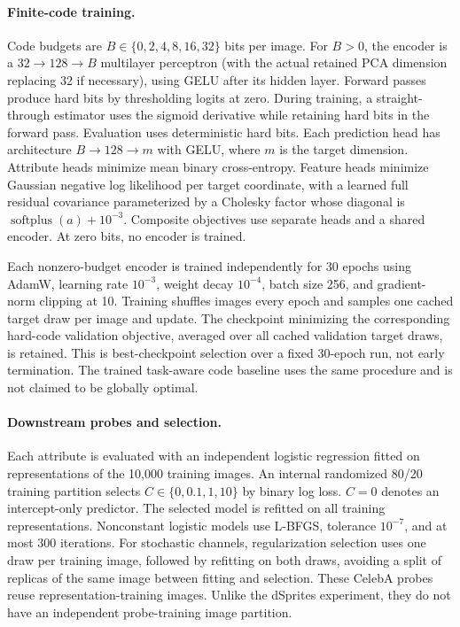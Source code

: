 \paragraph{Finite-code training.}
Code budgets are $B\in\{0,2,4,8,16,32\}$ bits per image. For $B>0$, the
encoder is a $32\!\rightarrow\!128\!\rightarrow\!B$ multilayer perceptron
(with the actual retained PCA dimension replacing 32 if necessary), using
GELU after its hidden layer. Forward passes produce hard bits by thresholding
logits at zero. During training, a straight-through estimator uses the
sigmoid derivative while retaining hard bits in the forward pass. Evaluation
uses deterministic hard bits. Each prediction head has architecture
$B\!\rightarrow\!128\!\rightarrow\!m$ with GELU, where $m$ is the target
dimension. Attribute heads minimize mean binary cross-entropy. Feature heads
minimize Gaussian negative log likelihood per target coordinate, with a
learned full residual covariance parameterized by a Cholesky factor whose
diagonal is $\operatorname{softplus}(a)+10^{-3}$. Composite objectives use
separate heads and a shared encoder. At zero bits, no encoder is trained.

Each nonzero-budget encoder is trained independently for 30 epochs using
AdamW, learning rate $10^{-3}$, weight decay $10^{-4}$, batch size 256, and
gradient-norm clipping at 10. Training shuffles images every epoch and samples
one cached target draw per image and update. The checkpoint minimizing the
corresponding hard-code validation objective, averaged over all cached
validation target draws, is retained. This is best-checkpoint selection over
a fixed 30-epoch run, not early termination. The trained task-aware code
baseline uses the same procedure and is not claimed to be globally optimal.

\paragraph{Downstream probes and selection.}
Each attribute is evaluated with an independent logistic regression fitted
on representations of the 10,000 training images. An internal randomized
80/20 training partition selects $C\in\{0,0.1,1,10\}$ by binary log loss.
$C=0$ denotes an intercept-only predictor. The selected model is refitted on
all training representations. Nonconstant logistic models use L-BFGS,
tolerance $10^{-7}$, and at most 300 iterations. For stochastic channels,
regularization selection uses one draw per training image, followed by
refitting on both draws, avoiding a split of replicas of the same image
between fitting and selection. These CelebA probes reuse representation-training
images. Unlike the dSprites experiment, they do not have an independent
probe-training image partition.

